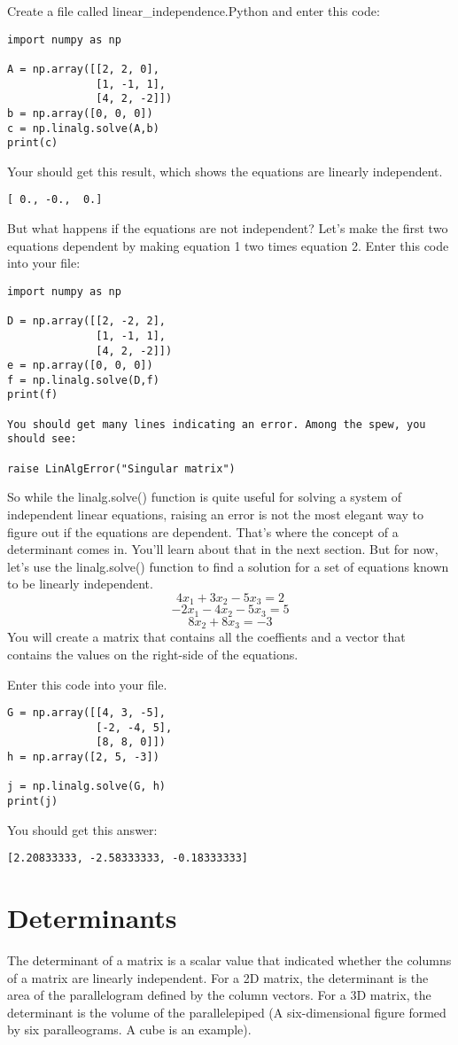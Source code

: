 Create a file called linear\_independence.Python and enter this code:
\begin{Verbatim}
import numpy as np

A = np.array([[2, 2, 0], 
              [1, -1, 1],
              [4, 2, -2]])
b = np.array([0, 0, 0])
c = np.linalg.solve(A,b)
print(c)
\end{Verbatim}
Your should get this result, which shows the equations are linearly independent.
\begin{Verbatim}
[ 0., -0.,  0.]
\end{Verbatim}
But what happens if the equations are not independent? Let's make the first two equations dependent by making equation 1 two times equation 2. Enter this code into your file:
\begin{Verbatim}
import numpy as np

D = np.array([[2, -2, 2], 
              [1, -1, 1],
              [4, 2, -2]])
e = np.array([0, 0, 0])
f = np.linalg.solve(D,f)
print(f)

You should get many lines indicating an error. Among the spew, you should see:

raise LinAlgError("Singular matrix")
\end{Verbatim}
So while the linalg.solve() function is quite useful for solving a system of independent linear equations, raising an error is not the most elegant way to figure out if the equations are dependent. That's where the concept of a determinant comes in. You'll learn about that in the next section. But for now, let's use the  linalg.solve() function to find a solution for a set of equations known to be linearly independent.
$$4x_1 + 3x_2 - 5x_3 = 2$$
$$-2x_1- 4x_2 - 5x_3 = 5$$
$$       8x_2 + 8x_3  = -3$$
You will create a matrix that contains all the coeffients and a vector that contains the values on the right-side of the equations. 

Enter this code into your file. 
\begin{Verbatim}
G = np.array([[4, 3, -5], 
              [-2, -4, 5], 
              [8, 8, 0]])
h = np.array([2, 5, -3])

j = np.linalg.solve(G, h)
print(j)
\end{Verbatim}
You should get this answer:
\begin{Verbatim}
[2.20833333, -2.58333333, -0.18333333]
\end{Verbatim}

\section{Determinants}
The determinant of a matrix is a scalar value that indicated whether the columns of a matrix are linearly independent. For a 2D matrix, the determinant is the area of the parallelogram defined by the column vectors. For a 3D matrix, the determinant is the volume of the parallelepiped (A six-dimensional figure formed by six paralleograms. A cube is an example). 

